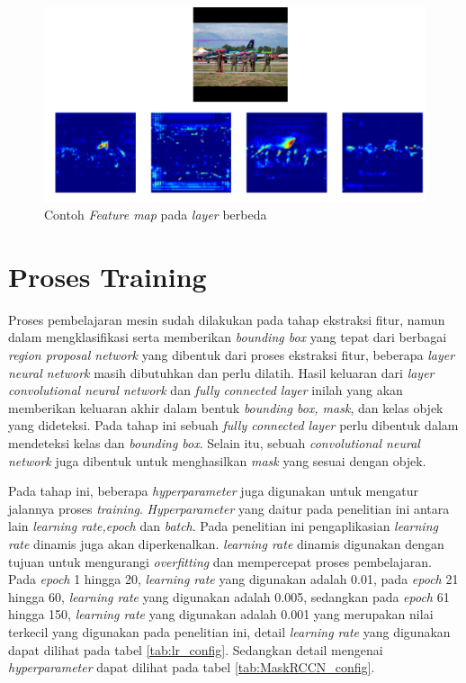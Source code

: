 \begin{figure}[h!]
  \begin{center}
    \includegraphics[width= 0.8\linewidth]{bab3/Contoh feature map.png}
    \caption{Contoh \textit{Feature map} pada \textit{layer} berbeda \cite{matterport_maskrcnn_2017}}
    \label{fig: Feature Map example}
  \end{center}
\end{figure}

\section{Proses Training}
Proses pembelajaran mesin sudah dilakukan pada tahap ekstraksi fitur, namun dalam mengklasifikasi
serta memberikan \textit{bounding box} yang tepat dari berbagai \textit{region proposal network} yang dibentuk
dari proses ekstraksi fitur, beberapa \textit{layer neural network} masih dibutuhkan dan perlu dilatih. 
Hasil keluaran dari \textit{layer convolutional neural network} dan \textit{fully connected layer} inilah yang
akan memberikan keluaran akhir dalam bentuk \textit{bounding box, mask}, dan kelas objek yang dideteksi.
Pada tahap ini sebuah \textit{fully connected layer} perlu dibentuk dalam mendeteksi kelas dan 
\textit{bounding box}. Selain itu, sebuah \textit{convolutional neural network} juga dibentuk untuk menghasilkan
\textit{mask} yang sesuai dengan objek. 

Pada tahap ini, beberapa \textit{hyperparameter} juga digunakan untuk mengatur
jalannya proses \textit{training}. \textit{Hyperparameter} yang daitur pada penelitian ini antara lain \textit{learning rate,epoch}
dan \textit{batch}. Pada penelitian ini pengaplikasian \textit{learning rate} dinamis juga akan diperkenalkan.
\textit{learning rate} dinamis digunakan dengan tujuan untuk mengurangi \textit{overfitting} dan mempercepat proses pembelajaran.
Pada \textit{epoch} 1 hingga 20, \textit{learning rate} yang digunakan adalah 0.01, pada \textit{epoch} 21 hingga
60, \textit{learning rate} yang digunakan adalah 0.005, sedangkan pada \textit{epoch} 61 hingga 150, 
\textit{learning rate} yang digunakan adalah 0.001 yang merupakan nilai terkecil yang digunakan pada penelitian
ini, detail \textit{learning rate} yang digunakan dapat dilihat pada tabel \ref{tab:lr_config}. Sedangkan
detail mengenai \textit{hyperparameter} dapat dilihat pada tabel \ref{tab:MaskRCCN_config}.

